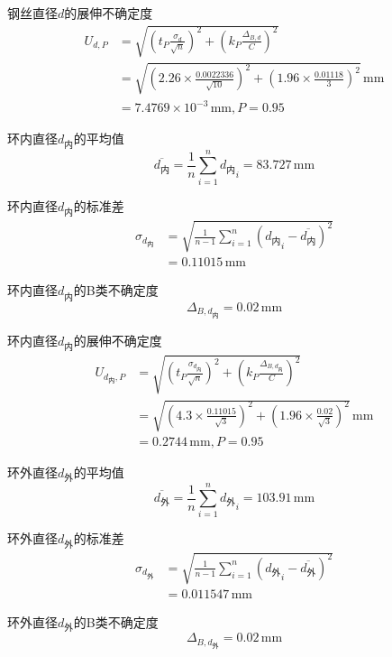 \documentclass[12pt,a4paper]{article}
\begin{document}
    钢丝直径$d$的展伸不确定度
    \[
        \begin{aligned}
            U_{d,P}&=\sqrt{\left(t_P\frac{\sigma_{d}}{\sqrt{n}}\right)^2+\left(k_P\frac{\Delta_{B,d}}{C}\right)^2}\\
            &=\sqrt{\left(2.26\times\frac{0.0022336}{\sqrt{10}}\right)^2+\left(1.96\times\frac{0.01118}{3}\right)^2}\,\mathrm{mm}\\
            &=7.4769 \times 10^{-3}\,\mathrm{mm},P=0.95
        \end{aligned}
    \]

    环内直径$d_\text{内}$的平均值
    \[
        \overline{d_\text{内}}=\frac{1}{n}\sum_{i=1}^{n}{d_\text{内}}_i=83.727\,\mathrm{mm}
    \]

    环内直径$d_\text{内}$的标准差
    \[
        \begin{aligned}
            \sigma_{d_\text{内}}&=\sqrt{\frac{1}{n-1}\sum_{i=1}^n\left({d_\text{内}}_i-\overline{d_\text{内}}\right)^2}\\
            &=0.11015\,\mathrm{mm}
        \end{aligned}
    \]

    环内直径$d_\text{内}$的B类不确定度
    \[
        \Delta_{B,d_\text{内}}=0.02\,\mathrm{mm}
    \]

    环内直径$d_\text{内}$的展伸不确定度
    \[
        \begin{aligned}
        U_{d_\text{内},P}&=\sqrt{\left(t_P\frac{\sigma_{d_\text{内}}}{\sqrt{n}}\right)^2+\left(k_P\frac{\Delta_{B,d_\text{内}}}{C}\right)^2}\\
        &=\sqrt{\left(4.3\times\frac{0.11015}{\sqrt{3}}\right)^2+\left(1.96\times\frac{0.02}{\sqrt{3}}\right)^2}\,\mathrm{mm}\\
        &=0.2744\,\mathrm{mm},P=0.95
        \end{aligned}
    \]

    环外直径$d_\text{外}$的平均值
    \[
        \overline{d_\text{外}}=\frac{1}{n}\sum_{i=1}^{n}{d_\text{外}}_i=103.91\,\mathrm{mm}
    \]

    环外直径$d_\text{外}$的标准差
    \[
        \begin{aligned}
            \sigma_{d_\text{外}}&=\sqrt{\frac{1}{n-1}\sum_{i=1}^n\left({d_\text{外}}_i-\overline{d_\text{外}}\right)^2}\\
            &=0.011547\,\mathrm{mm}
        \end{aligned}
    \]

    环外直径$d_\text{外}$的B类不确定度
    \[
        \Delta_{B,d_\text{外}}=0.02\,\mathrm{mm}
    \]
\end{document}
